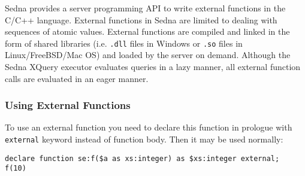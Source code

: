 \documentclass[a4paper,12pt]{article}
\begin{document}
Sedna provides a server programming API to write external
functions in the C/C++ language.
External functions in Sedna are limited to dealing with sequences of atomic values.
External functions are compiled and linked in the form of shared
libraries (i.e. \verb!.dll! files in Windows or \verb!.so! files in Linux/FreeBSD/Mac OS)
and loaded by the server on demand.
Although the Sedna XQuery executor evaluates queries in a lazy manner, all external function calls are evaluated in an eager manner.

\subsubsection*{Using External Functions}
To use an external function you need to declare this function in prologue
with \verb!external! keyword instead of function body. Then it may be used
normally:
\begin{verbatim}
declare function se:f($a as xs:integer) as $xs:integer external;
f(10)
\end{verbatim}
\end{document}
